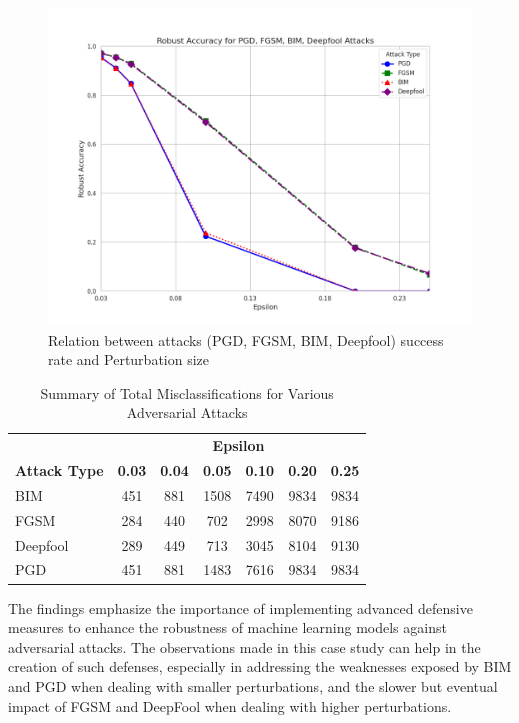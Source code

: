 \documentclass[10pt, conference, a4paper, final]{IEEEtran}
\begin{document}
\begin{figure}[ht]
    \centering
    \includegraphics[width=\linewidth]{paper_images/robust.png}
    \caption{Relation between attacks (PGD, FGSM, BIM, Deepfool) success rate and Perturbation size}
    \label{fig:robust_accuracy_attacks}
\end{figure}


\begin{table}[ht]
    \centering
    \caption{Summary of Total Misclassifications for Various Adversarial Attacks}
    \label{tab:misclassifications}
    \begin{tabular}{|l|c|c|c|c|c|c|}
    \hline
    & \multicolumn{6}{c|}{\textbf{Epsilon}} \\ \cline{2-7} 
    \multirow{-2}{*}{\textbf{Attack Type}} & \textbf{0.03} & \textbf{0.04} & \textbf{0.05} & \textbf{0.10} & \textbf{0.20} & \textbf{0.25} \\ \hline
    BIM & 451 & 881 & 1508 & 7490 & 9834 & 9834 \\ \hline
    FGSM & 284 & 440 & 702 & 2998 & 8070 & 9186 \\ \hline
    Deepfool & 289 & 449 & 713 & 3045 & 8104 & 9130 \\ \hline
    PGD & 451 & 881 & 1483 & 7616 & 9834 & 9834 \\ \hline
    \end{tabular}
\end{table}

The findings emphasize the importance of implementing advanced defensive measures to enhance the robustness of machine learning models against 
adversarial attacks. The observations made in this case study can help in the creation of such defenses, especially in addressing the weaknesses exposed by BIM and PGD when dealing with smaller perturbations, and the slower but eventual impact of FGSM and DeepFool when dealing with higher perturbations.
\end{document}
